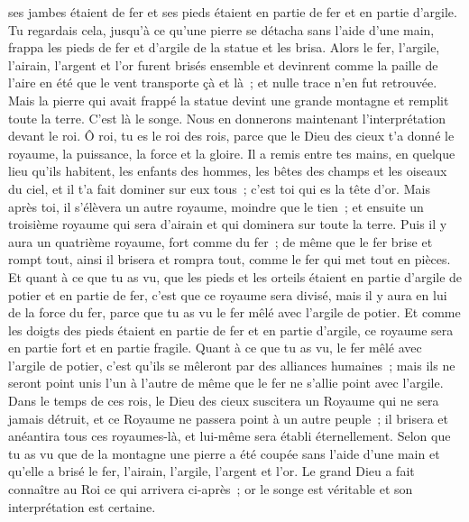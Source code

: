 \begin{multicols}{2}
ses jambes étaient de fer et ses pieds étaient en partie de fer et en partie d'argile.
Tu regardais cela, jusqu'à ce qu'une pierre se détacha sans l'aide d'une main, frappa les pieds de fer et d'argile de la statue et les brisa.
Alors le fer, l'argile, l'airain, l'argent et l'or furent brisés ensemble et devinrent comme la paille de l'aire en été que le vent transporte çà et là~; et nulle trace n'en fut retrouvée. Mais la pierre qui avait frappé la statue devint une grande montagne et remplit toute la terre.
C'est là le songe. Nous en donnerons maintenant l'interprétation devant le roi.
Ô roi, tu es le roi des rois, parce que le Dieu des cieux t'a donné le royaume, la puissance, la force et la gloire.
Il a remis entre tes mains, en quelque lieu qu'ils habitent, les enfants des hommes, les bêtes des champs et les oiseaux du ciel, et il t'a fait dominer sur eux tous~; c'est toi qui es la tête d'or.
Mais après toi, il s'élèvera un autre royaume, moindre que le tien~; et ensuite un troisième royaume qui sera d'airain et qui dominera sur toute la terre.
Puis il y aura un quatrième royaume, fort comme du fer~; de même que le fer brise et rompt tout, ainsi il brisera et rompra tout, comme le fer qui met tout en pièces.
Et quant à ce que tu as vu, que les pieds et les orteils étaient en partie d'argile de potier et en partie de fer, c'est que ce royaume sera divisé, mais il y aura en lui de la force du fer, parce que tu as vu le fer mêlé avec l'argile de potier.
Et comme les doigts des pieds étaient en partie de fer et en partie d'argile, ce royaume sera en partie fort et en partie fragile.
 Quant à ce que tu as vu, le fer mêlé avec l'argile de potier, c'est qu'ils se mêleront par des alliances humaines~; mais ils ne seront point unis l'un à l'autre de même que le fer ne s'allie point avec l'argile.
Dans le temps de ces rois, le Dieu des cieux suscitera un Royaume qui ne sera jamais détruit, et ce Royaume ne passera point à un autre peuple~; il brisera et anéantira tous ces royaumes-là, et lui-même sera établi éternellement.
Selon que tu as vu que de la montagne une pierre a été coupée sans l'aide d'une main et qu'elle a brisé le fer, l'airain, l'argile, l'argent et l'or. Le grand Dieu a fait connaître au Roi ce qui arrivera ci-après~; or le songe est véritable et son interprétation est certaine.

\end{multicols}

